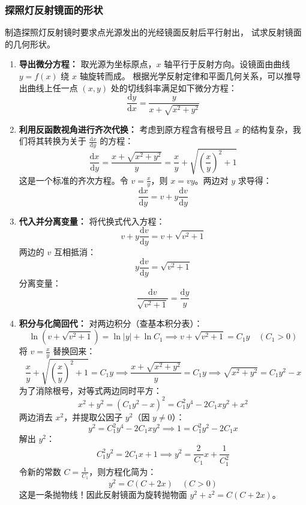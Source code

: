 \documentclass[lang=cn,11pt]{elegantbook}
\begin{document}
\subsubsection*{探照灯反射镜面的形状}

\begin{exercise} \label{ex:ode-searchlight-mirror}
制造探照灯反射镜时要求点光源发出的光经镜面反射后平行射出，
试求反射镜面的几何形状。
\end{exercise}

\begin{solution}
\begin{enumerate}
    \item \textbf{导出微分方程：}
    取光源为坐标原点，$x$ 轴平行于反射方向。设镜面由曲线 $y=f(x)$ 绕 $x$ 轴旋转而成。
    根据光学反射定律和平面几何关系，可以推导出曲线上任一点 $(x, y)$ 处的切线斜率满足如下微分方程：
    \[
    \frac{\mathrm{d}y}{\mathrm{d}x} = \frac{y}{x+\sqrt{x^{2}+y^{2}}} \tag{5.4}
    \]

    \item \textbf{利用反函数视角进行齐次代换：}
    考虑到原方程含有根号且 $x$ 的结构复杂，我们将其转换为关于 $\frac{\mathrm{d}x}{\mathrm{d}y}$ 的方程：
    \[
    \frac{\mathrm{d}x}{\mathrm{d}y} = \frac{x+\sqrt{x^2+y^2}}{y} = \frac{x}{y} + \sqrt{\left(\frac{x}{y}\right)^2 + 1}
    \]
    这是一个标准的齐次方程。令 $v = \frac{x}{y}$，则 $x = vy$。两边对 $y$ 求导得：
    \[
    \frac{\mathrm{d}x}{\mathrm{d}y} = v + y\frac{\mathrm{d}v}{\mathrm{d}y}
    \]

    \item \textbf{代入并分离变量：}
    将代换式代入方程：
    \[
    v + y\frac{\mathrm{d}v}{\mathrm{d}y} = v + \sqrt{v^2+1}
    \]
    两边的 $v$ 互相抵消：
    \[
    y\frac{\mathrm{d}v}{\mathrm{d}y} = \sqrt{v^2+1}
    \]
    分离变量：
    \[
    \frac{\mathrm{d}v}{\sqrt{v^2+1}} = \frac{\mathrm{d}y}{y}
    \]

    \item \textbf{积分与化简回代：}
    对两边积分（查基本积分表）：
    \[
    \ln(v + \sqrt{v^2+1}) = \ln|y| + \ln C_1 \implies v + \sqrt{v^2+1} = C_1 y \quad (C_1 > 0)
    \]
    将 $v = \frac{x}{y}$ 替换回来：
    \[
    \frac{x}{y} + \sqrt{\left(\frac{x}{y}\right)^2 + 1} = C_1 y \implies \frac{x + \sqrt{x^2+y^2}}{y} = C_1 y \implies \sqrt{x^2+y^2} = C_1 y^2 - x
    \]
    为了消除根号，对等式两边同时平方：
    \[
    x^2 + y^2 = (C_1 y^2 - x)^2 = C_1^2 y^4 - 2C_1 x y^2 + x^2
    \]
    两边消去 $x^2$，并提取公因子 $y^2$（因 $y \neq 0$）：
    \[
    y^2 = C_1^2 y^4 - 2C_1 x y^2 \implies 1 = C_1^2 y^2 - 2C_1 x
    \]
    解出 $y^2$：
    \[
    C_1^2 y^2 = 2C_1 x + 1 \implies y^2 = \frac{2}{C_1}x + \frac{1}{C_1^2}
    \]
    令新的常数 $C = \frac{1}{C_1}$，则方程化简为：
    \[
    \boxed{y^{2}=C(C+2x)} \quad (C>0)
    \]
    这是一条抛物线！因此反射镜面为旋转抛物面 $y^{2}+z^{2}=C(C+2x)$。
\end{enumerate}
\end{solution}
\end{document}
